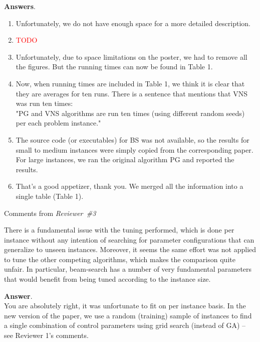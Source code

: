 \documentclass [11pt]{scrartcl}
\begin{document}
\textbf{Answers}. 
\begin{enumerate}
	
\item Unfortunately, we do not have enough space for a more detailed description.
\item \textcolor{red}{TODO}
\item Unfortunately, due to space limitations on the poster, we had to remove all the figures. But the running times can now be found in Table 1.
\item Now, when running times are included in Table 1, we think it is clear that they are averages for ten runs. There is a sentence that mentions that VNS was run ten times:\\ 
"PG and VNS algorithms are run ten times (using different random seeds) per each problem instance."
\item The source code (or executables) for BS was not available, so the results for small to medium instances were simply copied from the corresponding paper. For large instances, we ran the original algorithm PG and reported the results.
\item That's a good appetizer, thank you. We merged all the information into a single table (Table 1).
 
\end{enumerate}

\begin{center} Comments from \textit{Reviewer\ \#3}
	
\end{center}


\begin{leftbar}
There is a fundamental issue with the tuning performed, which is done per instance without any intention of searching for parameter configurations that can generalize to unseen instances. Moreover, it seems the same effort was not applied to tune the other competing algorithms, which makes the comparison quite unfair. In particular, beam-search has a number of very fundamental parameters that would benefit from being tuned according to the instance size.	
\end{leftbar}

\textbf{Answer}. \\
You are absolutely right, it was unfortunate to fit on per instance basis.
In the new version of the paper, we use a random (training) sample of instances to find a single combination of control parameters using grid search (instead of GA) -- see Reviewer 1's comments.
\end{document}
